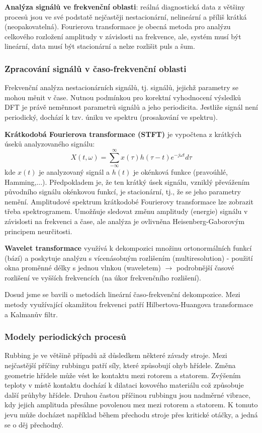 \textbf{Analýza signálů ve frekvenční oblasti}: reálná diagnostická data z většiny procesů jsou ve své podstatě nejčastěji nestacionární, nelineární a příliš krátká (neopakovatelná). Fourierova transformace je obecná metoda pro analýzu celkového rozložení amplitudy v závislosti na frekvence, ale, systém musí být lineární, data musí být stacionární a nelze rozlišit puls a šum.

\subsubsection*{Zpracování signálů v časo-frekvenční oblasti}
Frekvenční analýza nestacionárních signálů, tj. signálů, jejichž parametry se mohou měnit v čase. Nutnou podmínkou pro korektní vyhodnocení výsledků DFT je právě neměnnost parametrů signálů a jeho periodicita. Jestliže signál není periodický, dochází k tzv. úniku ve spektru (prosakování ve spektru).

\textbf{Krátkodobá Fourierova transformace (STFT)} je vypočtena z krátkých úseků analyzovaného signálu:
\begin{equation}
X(t,\omega) = \displaystyle{\sum_{-\infty}^\infty} x(\tau)h(\tau-t)e^{-j\omega t}d\tau
\end{equation}
kde $ x(t) $ je analyzovaný signál a $ h(t) $ je okénková funkce (pravoúhlé, Hamming,...). Předpokladem je, že ten krátký úsek signálu, vzniklý převážením původního signálu okénkovou funkcí, je stacionární, tj., že se jeho parametry nemění. Amplitudové spektrum krátkodobé Fourierovy transformace lze zobrazit třeba spektrogramem. Umožňuje sledovat změnu amplitudy (energie) signálu v závislosti na frekvenci a čase, ale analýza je ovlivněna Heisenberg-Gaborovým principem neurčitosti.

\textbf{Wavelet transformace} využívá k dekompozici množinu ortonormálních funkcí (bází) a poskytuje analýzu s vícenásobným rozlišením (multiresolution) - použití okna proměnné délky s jednou vlnkou (waveletem) $ \to $ podrobnější časové rozlišení ve vyšších frekvencích (na úkor frekvenčního rozlišení). 

Dosud jsme se bavili o metodách lineární časo-frekvenční dekompozice. Mezi metody využívající okamžitou frekvenci patří Hilbertova-Huangova transformace a Kalmanův filtr.

\subsubsection*{Modely periodických procesů}
Rubbing je ve většině případů až důsledkem některé závady stroje. Mezi nejčastější příčiny rubbingu patří síly, které způsobují ohyb hřídele. Změna geometrie hřídele může vést ke kontaktu mezi rotorem a statorem. Zvýšením teploty v místě kontaktu dochází k dilataci kovového materiálu což způsobuje další průhyby hřídele. Druhou častou příčinou rubbingu jsou nadměrné vibrace, kdy jejich amplituda přesáhne povolenou mez mezi rotorem a statorem. K tomuto jevu může docházet například během přechodu stroje přes kritické otáčky, a jedná se o děj přechodný.

